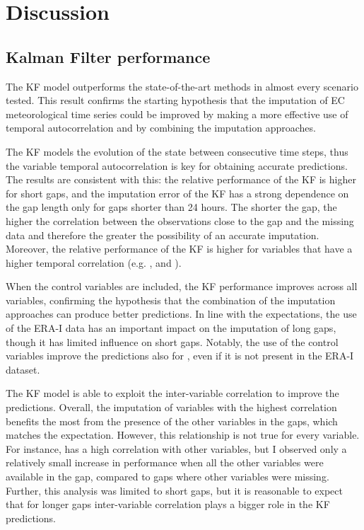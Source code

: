 \documentclass{article}
\let\Oldsection\section
\renewcommand{\section}{\FloatBarrier\Oldsection}
\let\Oldsubsection\subsection
\renewcommand{\subsection}{\FloatBarrier\Oldsubsection}
\begin{document}
\section{Discussion}

\subsection{Kalman Filter performance}

The KF model outperforms the state-of-the-art methods in almost every scenario tested. This result confirms the starting hypothesis that the imputation of EC meteorological time series could be improved by making a more effective use of temporal autocorrelation and by combining the imputation approaches.

The KF models the evolution of the state between consecutive time steps, thus the variable temporal autocorrelation is key for obtaining accurate predictions. The results are consistent with this: the relative performance of the KF is higher for short gaps, and the imputation error of the KF has a strong dependence on the gap length only for gaps shorter than 24 hours.  The shorter the gap, the higher the correlation between the observations close to the gap and the missing data and therefore the greater the possibility of an accurate imputation. Moreover, the relative performance of the KF is higher for variables that have a higher temporal correlation (e.g. ,  and ).

When the control variables are included, the KF performance improves across all variables, confirming the hypothesis that the combination of the imputation approaches can produce better predictions. In line with the expectations, the use of the ERA-I data has an important impact on the imputation of long gaps, though it has limited influence on short gaps. Notably, the use of the control variables improve the predictions also for , even if it is not present in the ERA-I dataset.

The KF model is able to exploit the inter-variable correlation to improve the predictions. Overall, the imputation of variables with the highest correlation benefits the most from the presence of the other variables in the gaps, which matches the expectation. However, this relationship is not true for every variable. For instance,  has a high correlation with other variables, but I observed only a relatively small increase in performance when all the other variables were available in the gap, compared to gaps where other variables were missing.
Further, this analysis was limited to short gaps, but it is reasonable to expect that for longer gaps inter-variable correlation plays a bigger role in the KF predictions.
\end{document}
